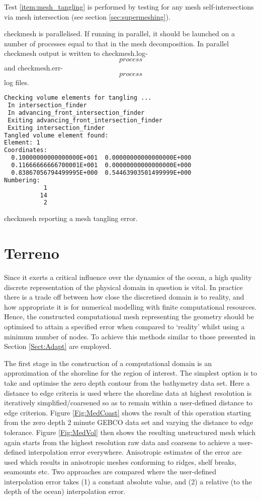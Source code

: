 Test \ref{item:mesh_tangling} is performed by testing for any mesh self-intersections
via mesh intersection (see section \ref{sec:supermeshing}).

checkmesh is parallelised. If running in parallel, it should be launched on a number
of processes equal to that in the mesh decomposition. In parallel checkmesh output
is written to checkmesh.log-\[process\] and checkmesh.err-\[process\] log files.

\begin{example}
\begin{lstlisting}[language = Bash]
Checking volume elements for tangling ...
 In intersection_finder
 In advancing_front_intersection_finder
 Exiting advancing_front_intersection_finder
 Exiting intersection_finder
Tangled volume element found: 
Element: 1
Coordinates:
  0.10000000000000000E+001  0.00000000000000000E+000
  0.11666666666700001E+001  0.00000000000000000E+000
  0.83867056794499995E+000  0.54463903501499999E+000
Numbering:
           1
          14
           2
\end{lstlisting}
\caption{checkmesh reporting a mesh tangling error.}
\end{example}

\section{Terreno}
Since it exerts a critical influence over the dynamics of the ocean,
a high quality discrete
representation of the physical domain in question is vital.
In practice there is a trade off between how close the discretised
domain is to reality, and how appropriate it is for numerical modelling
with finite computational resources. Hence, the constructed computational mesh
representing the geometry should be optimised
to attain a specified error when compared to `reality'
whilst using a minimum number of nodes. To achieve this methods similar to those
presented in Section \ref{Sect:Adapt} are employed.

The first stage in the construction of a computational
domain is an approximation of the shoreline for the region of
interest. The simplest option is to take and optimise the zero
depth contour from the bathymetry data set. Here a distance to edge criteria is
used where the shoreline data at highest resolution is iteratively simplified/coarsened
so as to remain within a user-defined distance to edge criterion. Figure \ref{Fig:MedCoast}
shows the result of this operation starting from the zero depth 2 minute GEBCO data set
and varying the distance to edge tolerance. Figure \ref{Fig:MedVol} then shows the
resulting unstructured mesh which again starts from the highest resolution raw data and
coarsens to achieve a user-defined interpolation error everywhere. Anisotropic
estimates of the error are used which results in anisotropic meshes conforming to ridges, shelf breaks,
seamounts etc. Two approaches are compared where the user-defined
interpolation error takes (1) a constant absolute value, and (2) a relative (to the depth of the ocean)
interpolation error.
